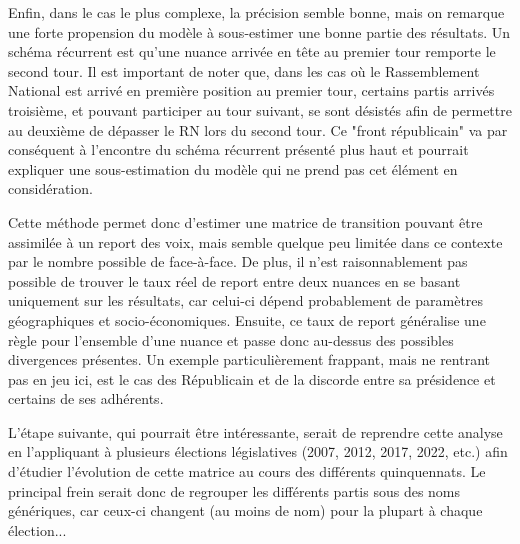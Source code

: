 \documentclass[11pt]{article}
\begin{document}
        Enfin, dans le cas le plus complexe, la précision semble bonne, mais on remarque une forte propension du modèle à sous-estimer une bonne partie des résultats. Un schéma récurrent est qu'une nuance arrivée en tête au premier tour remporte le second tour. Il est important de noter que, dans les cas où le Rassemblement National est arrivé en première position au premier tour, certains partis arrivés troisième, et pouvant participer au tour suivant, se sont désistés afin de permettre au deuxième de dépasser le RN lors du second tour. Ce "front républicain" va par conséquent à l'encontre du schéma récurrent présenté plus haut et pourrait expliquer une sous-estimation du modèle qui ne prend pas cet élément en considération.

        Cette méthode permet donc d'estimer une matrice de transition pouvant être assimilée à un report des voix, mais semble quelque peu limitée dans ce contexte par le nombre possible de face-à-face. De plus, il n'est raisonnablement pas possible de trouver le taux réel de report entre deux nuances en se basant uniquement sur les résultats, car celui-ci dépend probablement de paramètres géographiques et socio-économiques. Ensuite, ce taux de report généralise une règle pour l'ensemble d'une nuance et passe donc au-dessus des possibles divergences présentes. Un exemple particulièrement frappant, mais ne rentrant pas en jeu ici, est le cas des Républicain et de la discorde entre sa présidence et certains de ses adhérents.

        L'étape suivante, qui pourrait être intéressante, serait de reprendre cette analyse en l'appliquant à plusieurs élections législatives (2007, 2012, 2017, 2022, etc.) afin d'étudier l'évolution de cette matrice au cours des différents quinquennats. Le principal frein serait donc de regrouper les différents partis sous des noms génériques, car ceux-ci changent (au moins de nom) pour la plupart à chaque élection...



    \printbibliography
\end{document}
